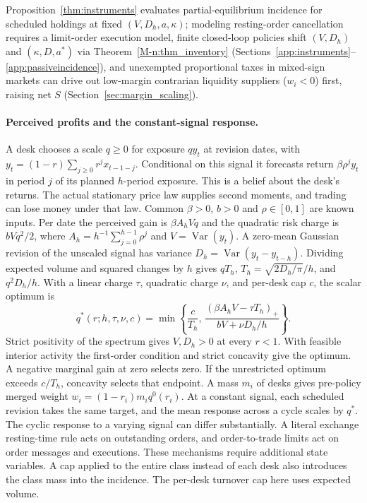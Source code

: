 \documentclass[12pt]{article}
\theoremstyle{definition}
\theoremstyle{remark}
\begin{document}
Proposition~\ref{thm:instruments} evaluates partial-equilibrium incidence for scheduled holdings at fixed $(V, D_h, a, \kappa)$; modeling resting-order cancellation requires a limit-order execution model, finite closed-loop policies shift $(V, D_h)$ and $(\kappa, D, a^*)$ via Theorem~\ref{M-n:thm_inventory} (Sections~\ref{app:instruments}--\ref{app:passiveincidence}), and unexempted proportional taxes in mixed-sign markets can drive out low-margin contrarian liquidity suppliers ($w_i < 0$) first, raising net $S$ (Section~\ref{sec:margin_scaling}).


\paragraph{Perceived profits and the constant-signal response.}
A desk chooses a scale $q\ge0$ for exposure $q y_t$ at revision dates, with
$y_t=(1-r)\sum_{j\ge0}r^j x_{t-1-j}$. Conditional on this signal it forecasts return
$\beta\rho^j y_t$ in period $j$ of its planned $h$-period exposure. This is a
belief about the desk's returns. The actual stationary price law supplies second
moments, and trading can lose money under that law. Common $\beta>0$, $b>0$ and
$\rho\in[0,1]$ are known inputs. Per date the perceived gain is $\beta A_h V q$ and
the quadratic risk charge is $bVq^2/2$, where $A_h=h^{-1}\sum_{j=0}^{h-1}\rho^j$ and
$V=\operatorname{Var}(y_t)$. A zero-mean Gaussian revision of the unscaled signal has
variance $D_h=\operatorname{Var}(y_t-y_{t-h})$. Dividing expected volume and squared
changes by $h$ gives $qT_h$, $T_h=\sqrt{2D_h/\pi}/h$, and $q^2D_h/h$. With a linear
charge $\tau$, quadratic charge $\nu$, and per-desk cap $c$, the scalar optimum is
\[
 q^*(r;h,\tau,\nu,c)=\min\left\{\frac{c}{T_h},\,
          \frac{(\beta A_h V-\tau T_h)_+}{bV+\nu D_h/h}\right\}.
\]
Strict positivity of the spectrum gives $V,D_h>0$ at every $r<1$. With feasible
interior activity the first-order condition and strict concavity give the optimum.
A negative marginal gain at zero selects zero. If the unrestricted optimum exceeds
$c/T_h$, concavity selects that endpoint. A mass $m_i$ of desks gives pre-policy
merged weight $w_i=(1-r_i)m_iq^0(r_i)$. At a constant signal, each scheduled revision
takes the same target, and the mean response across a cycle scales by $q^*$. The
cyclic response to a varying signal can differ substantially. A literal exchange
resting-time rule acts on outstanding orders, and order-to-trade limits act on order
messages and executions. These mechanisms require additional state variables. A cap
applied to the entire class instead of each desk also introduces the class mass into
the incidence. The per-desk turnover cap here uses expected volume.
\end{document}
